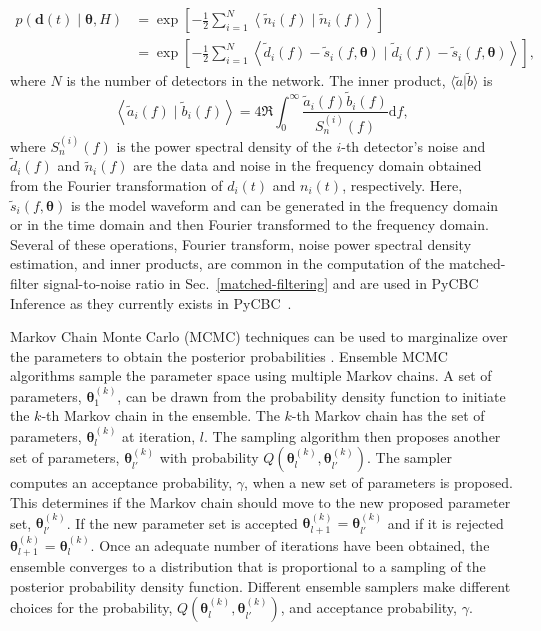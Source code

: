 \begin{equation}
    \begin{split}
        p(\boldsymbol{d}(t) \mid \boldsymbol{\theta}, H)&=\exp \left[-\frac{1}{2} \sum_{i=1}^{N}\left\langle\tilde{n}_{i}(f) \mid \tilde{n}_{i}(f)\right\rangle\right] \\
        \quad
        &=\exp \left[-\frac{1}{2} \sum_{i=1}^{N}\left\langle\tilde{d}_{i}(f)-\tilde{s}_{i}(f, \boldsymbol{\theta}) \mid \tilde{d}_{i}(f)-\tilde{s}_{i}(f, \boldsymbol{\theta})\right\rangle\right],
    \end{split}
\end{equation}
where $N$ is the number of detectors in the network. The inner product, $\langle\tilde{a}|\tilde{b}\rangle$ is 
\begin{equation}
    \left\langle\tilde{a}_{i}(f) \mid \tilde{b}_{i}(f)\right\rangle=4 \Re \int_{0}^{\infty} \frac{\tilde{a}_{i}(f) \tilde{b}_{i}(f)}{S_{n}^{(i)}(f)} \mathrm{d}f,
\end{equation}
where $S_{n}^{(i)}(f)$ is the power spectral density of the $i$-th detector's noise and $\tilde{d}_i(f)$ and $\tilde{n}_i(f)$ are the data and noise in the frequency domain obtained from the Fourier transformation of $d_i(t)$ and $n_i(t)$, respectively. Here, $\tilde{s}_i(f,\boldsymbol{\theta})$ is the model waveform and can be generated in the frequency domain or in the time domain and then Fourier transformed to the frequency domain. Several of these operations, Fourier transform, noise power spectral density estimation, and inner products, are common in the computation of the matched-filter signal-to-noise ratio in Sec.~\ref{matched-filtering} and are used in PyCBC Inference as they currently exists in PyCBC~\cite{Allen:2005fk, Usman:2015kfa, Nitz:2017svb}.

Markov Chain Monte Carlo (MCMC) techniques can be used to marginalize over the parameters to obtain the posterior probabilities \cite{Christensen:2001cr}. Ensemble MCMC algorithms sample the parameter space using multiple Markov chains. A set of parameters, $\boldsymbol{\theta}^{(k)}_1$, can be drawn from the probability density function to initiate the $k$-th Markov chain in the ensemble. The $k$-th Markov chain has the set of parameters, $\boldsymbol{\theta}^{(k)}_l$ at iteration, $l$. The sampling algorithm then proposes another set of parameters, $\boldsymbol{\theta}^{(k)}_{l'}$ with probability $Q(\boldsymbol{\theta}^{(k)}_{l}, \boldsymbol{\theta}^{(k)}_{l'})$. The sampler computes an acceptance probability, $\gamma$, when a new set of parameters is proposed. This determines if the Markov chain should move to the new proposed parameter set, $\boldsymbol{\theta}^{(k)}_{l'}$. If the new parameter set is accepted $\boldsymbol{\theta}^{(k)}_{l+1}=\boldsymbol{\theta}^{(k)}_{l'}$ and if it is rejected $\boldsymbol{\theta}^{(k)}_{l+1}=\boldsymbol{\theta}^{(k)}_{l}$. Once an adequate number of iterations have been obtained, the ensemble converges to a distribution that is proportional to a sampling of the posterior probability density function. Different ensemble samplers make different choices for the probability, $Q(\boldsymbol{\theta}^{(k)}_{l}, \boldsymbol{\theta}^{(k)}_{l'})$, and acceptance probability, $\gamma$. 

